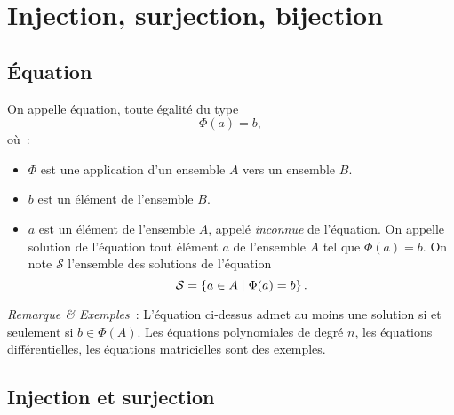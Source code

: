 \section{Injection, surjection, bijection}
\label{chap3-sec:injsurbij}
%
%
\subsection{Équation}
\label{chap3-subsec:equation}
\begin{defdef}
  On appelle équation, toute égalité du type
  \begin{equation}
    \Phi(a)=b,
  \end{equation}
  où~:
  \begin{itemize}
  \item \(\Phi\) est une application d'un ensemble \(A\) vers un ensemble \(B\).
  \item \(b\) est un élément de l'ensemble \(B\).
  \item \(a\) est un élément de l'ensemble \(A\), appelé \emph{inconnue} de l'équation. On appelle solution de l'équation tout élément \(a\) de l'ensemble \(A\) tel que \(\Phi(a)=b\). On note \(\mathcal{S}\) l'ensemble des solutions de l'équation
    \begin{equation}
      \mathcal{S} = \left\{a \in A\mathrel{}\middle|\mathrel{}\Phi(a)=b\right\}.
    \end{equation}
  \end{itemize}
\end{defdef}
\emph{Remarque \& Exemples}~: L'équation ci-dessus admet au moins une solution si et seulement si \(b \in \Phi(A)\). Les équations polynomiales de degré \(n\), les équations différentielles, les équations matricielles sont des exemples.
%
\subsection{Injection et surjection}
\label{chap3-subsec:injetsurj}
